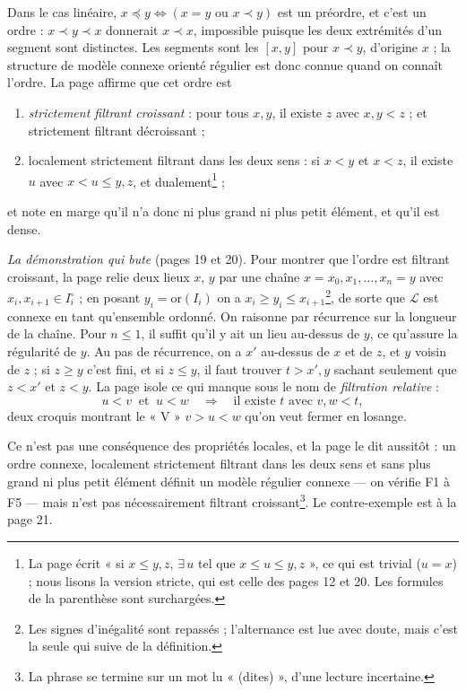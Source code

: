 \documentclass[11pt,a4paper]{article}
\begin{document}
Dans le cas linéaire, $x \preccurlyeq y \iff (x = y \text{ ou } x \prec y)$
est un préordre, et c'est un ordre : $x \prec y \prec x$ donnerait $x \prec
x$, impossible puisque les deux extrémités d'un segment sont distinctes. Les
segments sont les $[x,y]$ pour $x \prec y$, d'origine $x$ ; la structure de
modèle connexe orienté régulier est donc connue quand on connaît l'ordre.
La page affirme que cet ordre est
\begin{enumerate}
\item[--] \emph{strictement filtrant croissant} : pour tous $x, y$, il existe
$z$ avec $x, y < z$ ; et strictement filtrant décroissant ;
\item[--] localement strictement filtrant dans les deux sens : si $x < y$ et
$x < z$, il existe $u$ avec $x < u \leq y, z$, et dualement\footnote{La page
écrit « si $x \leq y, z$, $\exists\, u$ tel que $x \leq u \leq y, z$ », ce qui
est trivial ($u = x$) ; nous lisons la version stricte, qui est celle des
pages 12 et 20. Les formules de la parenthèse sont surchargées.} ;
\end{enumerate}
et note en marge qu'il n'a donc ni plus grand ni plus petit élément, et qu'il
est dense.

\emph{La démonstration qui bute} (pages 19 et 20). Pour montrer que l'ordre
est filtrant croissant, la page relie deux lieux $x$, $y$ par une chaîne
$x = x_{0}, x_{1}, \dots, x_{n} = y$ avec $x_{i}, x_{i+1} \in I_{i}^{\circ}$ ;
en posant $y_{i} = \mathrm{or}(I_{i})$ on a $x_{i} \geq y_{i} \leq
x_{i+1}$\footnote{Les signes d'inégalité sont repassés ; l'alternance est lue
avec doute, mais c'est la seule qui suive de la définition.}, de sorte que
$\mathcal{L}$ est connexe en tant qu'ensemble ordonné. On raisonne par
récurrence sur la longueur de la chaîne. Pour $n \leq 1$, il suffit qu'il y
ait un lieu au-dessus de $y$, ce qu'assure la régularité de $y$. Au pas de
récurrence, on a $x'$ au-dessus de $x$ et de $z$, et $y$ voisin de $z$ ; si
$z \geq y$ c'est fini, et si $z \leq y$, il faut trouver $t > x', y$ sachant
seulement que $z < x'$ et $z < y$. La page isole ce qui manque sous le nom de
\emph{filtration relative} :
\[
u < v \ \text{ et } \ u < w \quad \Longrightarrow \quad \text{il existe } t
\text{ avec } v, w < t,
\]
deux croquis montrant le « V » $v > u < w$ qu'on veut fermer en losange.

Ce n'est pas une conséquence des propriétés locales, et la page le dit
aussitôt : un ordre connexe, localement strictement filtrant dans les deux
sens et sans plus grand ni plus petit élément définit un modèle régulier
connexe --- on vérifie F1 à F5 --- mais n'est pas nécessairement filtrant
croissant\footnote{La phrase se termine sur un mot lu « (dites) », d'une
lecture incertaine.}. Le contre-exemple est à la page 21.
\end{document}
